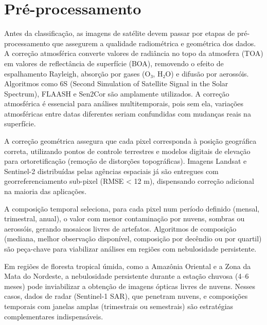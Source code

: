 \documentclass[
  portuguese,
  11pt,
  a4paper,
  open=any]{scrbook}
\begin{document}
\section{Pré-processamento}\label{pruxe9-processamento}

Antes da classificação, as imagens de satélite devem passar por etapas
de pré-processamento que assegurem a qualidade radiométrica e geométrica
dos dados. A correção atmosférica converte valores de radiância no topo
da atmosfera (TOA) em valores de reflectância de superfície (BOA),
removendo o efeito de espalhamento Rayleigh, absorção por gases (O₃,
H₂O) e difusão por aerossóis. Algoritmos como 6S (Second Simulation of
Satellite Signal in the Solar Spectrum), FLAASH e Sen2Cor são amplamente
utilizados. A correção atmosférica é essencial para análises
multitemporais, pois sem ela, variações atmosféricas entre datas
diferentes seriam confundidas com mudanças reais na superfície.

A correção geométrica assegura que cada pixel corresponda à posição
geográfica correta, utilizando pontos de controle terrestres e modelos
digitais de elevação para ortoretificação (remoção de distorções
topográficas). Imagens Landsat e Sentinel-2 distribuídas pelas agências
espaciais já são entregues com georreferenciamento sub-pixel (RMSE
\textless{} 12 m), dispensando correção adicional na maioria das
aplicações.

A composição temporal seleciona, para cada pixel num período definido
(mensal, trimestral, anual), o valor com menor contaminação por nuvens,
sombras ou aerossóis, gerando mosaicos livres de artefatos. Algoritmos
de composição (mediana, melhor observação disponível, composição por
decêndio ou por quartil) são peça-chave para viabilizar análises em
regiões com nebulosidade persistente.

\begin{tcolorbox}[enhanced jigsaw, colbacktitle=quarto-callout-important-color!10!white, coltitle=black, opacityback=0, breakable, left=2mm, colback=white, bottomtitle=1mm, toptitle=1mm, titlerule=0mm, arc=.35mm, opacitybacktitle=0.6, leftrule=.75mm, colframe=quarto-callout-important-color-frame, title=\textcolor{quarto-callout-important-color}{\faExclamation}\hspace{0.5em}{Nebulosidade em regiões tropicais}, rightrule=.15mm, bottomrule=.15mm, toprule=.15mm]

Em regiões de floresta tropical úmida, como a Amazônia Oriental e a Zona
da Mata do Nordeste, a nebulosidade persistente durante a estação
chuvosa (4--6 meses) pode inviabilizar a obtenção de imagens ópticas
livres de nuvens. Nesses casos, dados de radar (Sentinel-1 SAR), que
penetram nuvens, e composições temporais com janelas amplas (trimestrais
ou semestrais) são estratégias complementares indispensáveis.

\end{tcolorbox}
\end{document}
